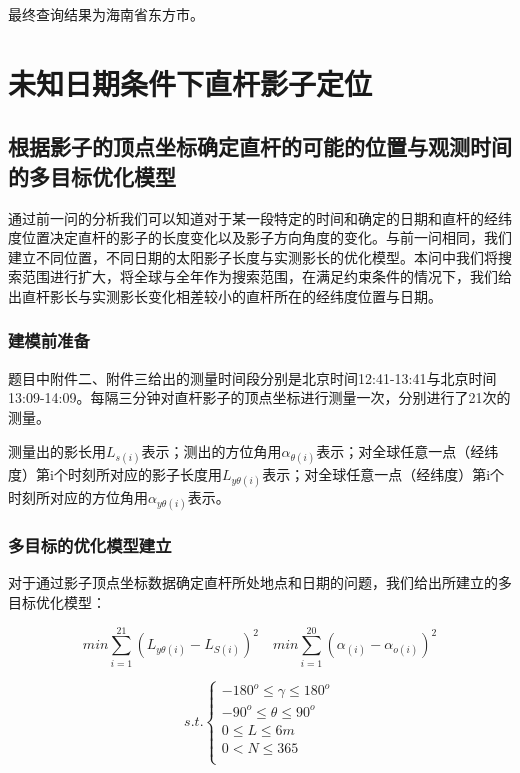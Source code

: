 \documentclass[withoutpreface,bwprint]{cumcmthesis} %
\begin{document}
最终查询结果为海南省东方市。

\newpage
\section{未知日期条件下直杆影子定位}
\subsection{根据影子的顶点坐标确定直杆的可能的位置与观测时间的多目标优化模型}


通过前一问的分析我们可以知道对于某一段特定的时间和确定的日期和直杆的经纬度位置决定直杆的影子的长度变化以及影子方向角度的变化。与前一问相同，我们建立不同位置，不同日期的太阳影子长度与实测影长的优化模型。本问中我们将搜索范围进行扩大，将全球与全年作为搜索范围，在满足约束条件的情况下，我们给出直杆影长与实测影长变化相差较小的直杆所在的经纬度位置与日期。

\subsubsection{建模前准备}
题目中附件二、附件三给出的测量时间段分别是北京时间12:41-13:41与北京时间13:09-14:09。每隔三分钟对直杆影子的顶点坐标进行测量一次，分别进行了21次的测量。

测量出的影长用$L_{s(i)}$表示；测出的方位角用$\alpha_{\theta(i)}$表示；对全球任意一点（经纬度）第i个时刻所对应的影子长度用$L_{y\theta (i)}$表示；对全球任意一点（经纬度）第i个时刻所对应的方位角用$\alpha_{y \theta (i)}$表示。

\subsubsection{多目标的优化模型建立}
对于通过影子顶点坐标数据确定直杆所处地点和日期的问题，我们给出所建立的多目标优化模型：

\begin{equation}
	\label{q3-1-min}
	min \sum\limits_{i=1}^{21}(L_{y\theta(i)} - L_{S(i)})^2 \quad min \sum\limits_{i=1}^{20}(\alpha_{(i)} - \alpha_{o(i)})^2 
\end{equation}

\begin{equation}
\label{moxingsan}
s.t.
\left\{  
  	\begin{array}{lr}  
  		-180^o \leqslant \gamma \leqslant 180^o\\
  		-90^o \leqslant \theta \leqslant 90^o\\
  		0 \leqslant L \leqslant 6m\\
  		0 < N \leqslant 365\\
	\end{array}  
\right.  
\end{equation}
\end{document}
